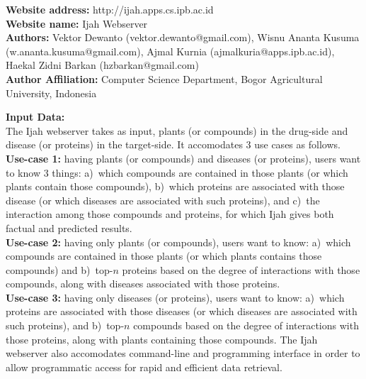 
\noindent
\textbf{Website address:} http://ijah.apps.cs.ipb.ac.id \\
\textbf{Website name:} Ijah Webserver \\
\textbf{Authors:}
Vektor Dewanto (vektor.dewanto@gmail.com),
Wisnu Ananta Kusuma (w.ananta.kusuma@gmail.com),
Ajmal Kurnia (ajmalkuria@apps.ipb.ac.id),
Haekal Zidni Barkan (hzbarkan@gmail.com) \\
\textbf{Author Affiliation:}
Computer Science Department, Bogor Agricultural University, Indonesia

\noindent
\textbf{Input Data:} \\
The Ijah webserver takes as input,
plants (or compounds) in the drug-side and disease (or proteins) in the target-side.
It accomodates 3 use cases as follows.\\
\textbf{Use-case 1:}
having plants (or compounds) and diseases (or proteins),
users want to know 3 things:
a)~which compounds are contained in those plants (or which plants contain those compounds),
b)~which proteins are associated with those disease (or which diseases are associated with such proteins), and
c)~the interaction among those compounds and proteins, for which Ijah gives both factual and predicted results.\\
\textbf{Use-case 2:}
having only plants (or compounds),
users want to know:
a)~which compounds are contained in those plants (or which plants contains those compounds) and
b)~top-$n$ proteins based on the degree of interactions with those compounds, along with diseases associated with those proteins.\\
\textbf{Use-case 3:}
having only diseases (or proteins),
users want to know:
a)~which proteins are associated with those diseases (or which diseases are associated with such proteins), and
b)~\mbox{top-$n$} compounds based on the degree of interactions with those proteins, along with plants containing those compounds.
The Ijah webserver also accomodates command-line and programming interface in order to allow
programmatic access for rapid and efficient data retrieval.

